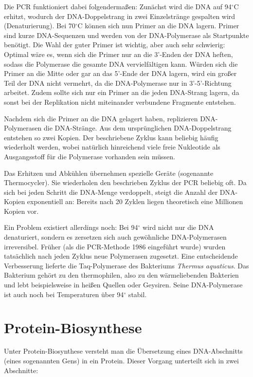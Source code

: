 Die PCR funktioniert dabei folgendermaßen: Zunächst wird die DNA auf 94$^\circ$C erhitzt, wodurch der DNA-Doppelstrang in zwei Einzelstränge gespalten wird (Denaturierung). Bei 70$^\circ$C können sich nun Primer an die DNA lagern. Primer sind kurze DNA-Sequenzen und werden von der DNA-Polymerase als Startpunkte benötigt. Die Wahl der guter Primer ist wichtig, aber auch sehr schwierig: Optimal wäre es, wenn sich die Primer nur an die 3'-Enden der DNA heften, sodass die Polymerase die gesamte DNA vervielfältigen kann. Würden sich die Primer an die Mitte oder gar an das 5'-Ende der DNA lagern, wird ein großer Teil der DNA nicht vermehrt, da die DNA-Polymerase nur in 3'-5'-Richtung arbeitet. Zudem sollte sich nur ein Primer an die jeden DNA-Strang lagern, da sonst bei der Replikation nicht miteinander verbundene Fragmente entstehen.

Nachdem sich die Primer an die DNA gelagert haben, replizieren DNA-Polymerasen die DNA-Stränge. Aus dem ursprünglichen DNA-Doppelstrang entstehen so zwei Kopien. Der beschriebene Zyklus kann beliebig häufig wiederholt werden, wobei natürlich hinreichend viele freie Nukleotide als Ausgangsstoff für die Polymerase vorhanden sein müssen.

Das Erhitzen und Abkühlen übernehmen spezielle Geräte (sogenannte Thermocycler). Sie wiederholen den beschrieben Zyklus der PCR beliebig oft. Da sich bei jeden Schritt die DNA-Menge verdoppelt, steigt die Anzahl der DNA-Kopien exponentiell an: Bereits nach 20 Zyklen liegen theoretisch eine Millionen Kopien vor.

Ein Problem existiert allerdings noch: Bei 94$^\circ$ wird nicht nur die DNA denaturiert, sondern es zersetzen sich auch gewöhnliche DNA-Polymerasen irreversibel. Früher (als die PCR-Methode 1986 eingeführt wurde) wurden tatsächlich nach jeden Zyklus neue Polymerasen zugesetzt. Eine entscheidende Verbesserung lieferte die Taq-Polymerase des Bakteriums \emph{Thermus aquaticus}. Das Bakterium gehört zu den thermophilen, also zu den wärmeliebenden Bakterien und lebt beispielsweise in heißen Quellen oder Geysiren. Seine DNA-Polymerase ist auch noch bei Temperaturen über 94$^\circ$ stabil.

\section{Protein-Biosynthese}
\label{sec:bio:pbsyn}


Unter Protein-Biosynthese versteht man die Übersetzung eines DNA-Abschnitts (eines sogenannten Gens) in ein Protein. Dieser Vorgang unterteilt sich in zwei Abschnitte:

